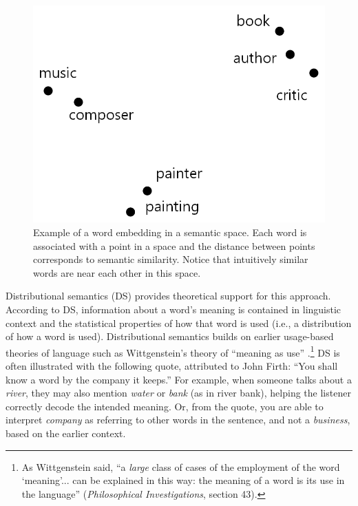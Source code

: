 \begin{figure}[h]
    \centering
    \includegraphics[scale=.2]{./images/Word_vector_demo.png}
    \caption[Adapted from an image generated using \url{http://vectors.nlpl.eu/explore/embeddings/en/}.]{Example of a word embedding in a semantic space. Each word is associated with a point in a space and the distance between points corresponds to semantic similarity. Notice that intuitively similar words are near each other in this space. }
 \label{f:writerPainterExample}
\end{figure}

Distributional semantics (DS) provides theoretical support for this approach. According to DS, information about a word's meaning is contained in linguistic context \cite{harris1954distributional, firth1957synopsis} and the statistical properties of how that word is used (i.e., a distribution of how a word is used). Distributional semantics builds on earlier usage-based theories of language such as Wittgenstein's theory of ``meaning as use'' \cite{wittgenstein1953philosophical}.\footnote{As Wittgenstein said, ``a \emph{large} class of cases of the employment of the word `meaning'... can be explained in this way: the meaning of a word is its use in the language'' (\emph{Philosophical Investigations}, section 43).} DS is often illustrated with the following quote, attributed to John Firth: ``You shall know a word by the company it keeps.'' For example, when someone talks about a \textit{river}, they may also mention \textit{water} or \textit{bank} (as in river bank), helping the listener correctly decode the intended meaning. Or, from the quote, you are able to interpret \textit{company} as referring to other words in the sentence, and not a \textit{business}, based on the earlier context.

